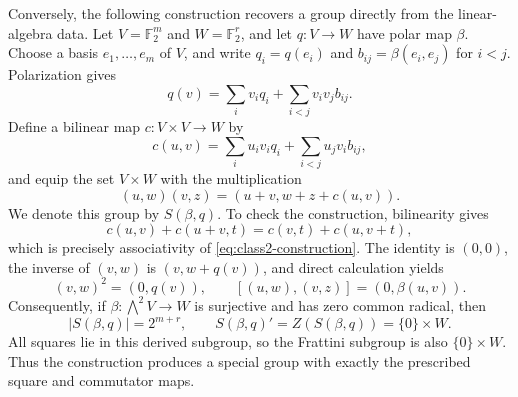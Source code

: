 \documentclass[11pt,a4paper]{amsart}
\theoremstyle{definition}
\theoremstyle{remark}
\numberwithin{equation}{section}
\begin{document}
Conversely, the following construction recovers a group directly from
the linear-algebra data. Let $V=\mathbb F_2^m$ and $W=\mathbb F_2^r$,
and let $q:V\to W$ have polar map $\beta$. Choose a basis
$e_1,\ldots,e_m$ of $V$, and write $q_i=q(e_i)$ and
$b_{ij}=\beta(e_i,e_j)$ for $i<j$. Polarization gives
\[
 q(v)=\sum_i v_iq_i+\sum_{i<j}v_iv_jb_{ij}.
\]
Define a bilinear map $c:V\times V\to W$ by
\[
 c(u,v)=\sum_i u_iv_iq_i+\sum_{i<j}u_jv_i b_{ij},
\]
and equip the set $V\times W$ with the multiplication
\begin{equation}\label{eq:class2-construction}
 (u,w)(v,z)=(u+v,w+z+c(u,v)).
\end{equation}
We denote this group by $S(\beta,q)$. To check the construction,
bilinearity gives
\[
 c(u,v)+c(u+v,t)=c(v,t)+c(u,v+t),
\]
which is precisely associativity of
\eqref{eq:class2-construction}. The identity is $(0,0)$, the inverse
of $(v,w)$ is $(v,w+q(v))$, and direct calculation yields
\[
 (v,w)^2=(0,q(v)),\qquad
 [(u,w),(v,z)]=(0,\beta(u,v)).
\]
Consequently, if $\beta:\bigwedge^2V\to W$ is surjective and has
zero common radical, then
\[
 |S(\beta,q)|=2^{m+r},\qquad
 S(\beta,q)'=Z(S(\beta,q))=\{0\}\times W.
\]
All squares lie in this derived subgroup, so the Frattini subgroup
is also $\{0\}\times W$. Thus the construction produces a special
group with exactly the prescribed square and commutator maps.
\end{document}

